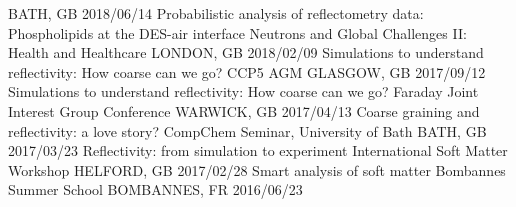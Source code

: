 \begin{dayenumerate}
    {BATH, GB}
    {2018/06/14}
  \cvpresentation
    {Probabilistic analysis of reflectometry data: Phospholipids at the DES-air interface}
    {Neutrons and Global Challenges II: Health and Healthcare}
    {LONDON, GB}
    {2018/02/09}
  \cvpresentation
    {Simulations to understand reflectivity: How coarse can we go?}
    {CCP5 AGM}
    {GLASGOW, GB}
    {2017/09/12}
  \cvpresentation
    {Simulations to understand reflectivity: How coarse can we go?}
    {Faraday Joint Interest Group Conference}
    {WARWICK, GB}
    {2017/04/13}
  \cvpresentation
    {Coarse graining and reflectivity: a love story?}
    {CompChem Seminar, University of Bath}
    {BATH, GB}
    {2017/03/23}
  \cvpresentation
    {Reflectivity: from simulation to experiment}
    {International Soft Matter Workshop}
    {HELFORD, GB}
    {2017/02/28}
  \cvpresentation
    {Smart analysis of soft matter}
    {Bombannes Summer School}
    {BOMBANNES, FR}
    {2016/06/23}
\end{dayenumerate}
